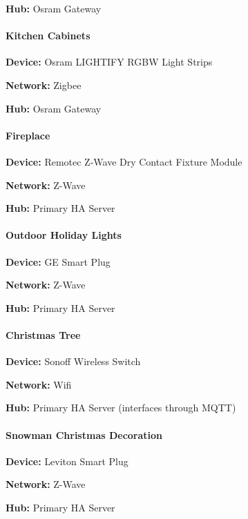 \documentclass[]{article}
\let\oldparagraph\paragraph
\renewcommand{\paragraph}[1]{\oldparagraph{#1}\mbox{}}
\begin{document}
\begin{multicols}{2}
\textbf{Hub: }
{Osram Gateway}

\paragraph{\texorpdfstring{{Kitchen Cabinets}}{Kitchen Cabinets}}

\textbf{Device: }
{Osram LIGHTIFY RGBW Light Strips}

\textbf{Network: }
{Zigbee}

\textbf{Hub: }
{Osram Gateway}

\paragraph{\texorpdfstring{{Fireplace}}{Fireplace}}

\textbf{Device: }
{Remotec Z-Wave Dry Contact Fixture Module}

\textbf{Network: }
{Z-Wave}

\textbf{Hub: }
{Primary HA Server}

\paragraph{\texorpdfstring{{Outdoor Holiday Lights}}{Outdoor Holiday Lights}}

\textbf{Device: }
{GE Smart Plug}

\textbf{Network: }
{Z-Wave}

\textbf{Hub: }
{Primary HA Server}

\paragraph{\texorpdfstring{{Christmas Tree}}{Christmas Tree}}

\textbf{Device: }
{Sonoff Wireless Switch}

\textbf{Network: }
{Wifi}

\textbf{Hub: }
{Primary HA Server (interfaces through MQTT)}

\paragraph{\texorpdfstring{{Snowman Christmas Decoration}}{Snowman Christmas Decoration}}

\textbf{Device: }
{Leviton Smart Plug}

\textbf{Network: }
{Z-Wave}

\textbf{Hub: }
{Primary HA Server}


\end{multicols}
\end{document}
